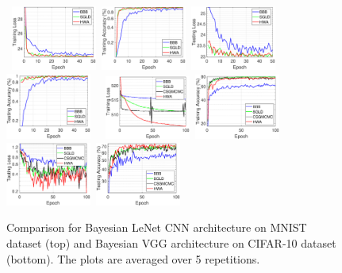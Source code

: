 \documentclass[tablecaption=bottom,wcp]{jmlr}
\begin{document}
\begin{figure}[H]
\mbox{
\includegraphics[width=0.25\textwidth]{newfigs/MNIST_train_loss.eps}
\includegraphics[width=0.25\textwidth]{newfigs/MNIST_train_acc.eps}
\includegraphics[width=0.25\textwidth]{newfigs/MNIST_test_loss.eps}
\includegraphics[width=0.25\textwidth]{newfigs/MNIST_test_acc.eps}
}
\mbox{
\includegraphics[width=0.25\textwidth]{newfigs/CIFAR_train_loss.eps}
\includegraphics[width=0.25\textwidth]{newfigs/CIFAR_train_acc.eps}
\includegraphics[width=0.25\textwidth]{newfigs/CIFAR_test_loss.eps}
\includegraphics[width=0.25\textwidth]{newfigs/CIFAR_test_acc.eps}
}
\vspace{-0.2in}
 \caption{Comparison for Bayesian LeNet CNN architecture on MNIST dataset (top) and Bayesian VGG architecture on CIFAR-10 dataset (bottom). The plots are averaged over 5 repetitions.}
\label{fig:all}
\end{figure}
\end{document}
